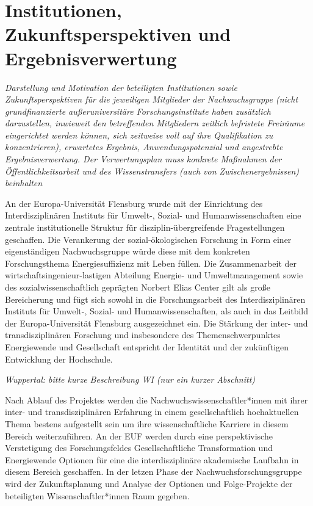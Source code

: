 \documentclass[a4paper,11pt,twoside]{scrartcl}
\begin{document}
\section{Institutionen, Zukunftsperspektiven und Ergebnisverwertung}
\textit{Darstellung und Motivation der beteiligten Institutionen sowie Zukunftsperspektiven für die jeweiligen Mitglieder der Nachwuchsgruppe (nicht grundfinanzierte außeruniversitäre Forschungsinstitute haben zusätzlich darzustellen, inwieweit den betreffenden Mitgliedern zeitlich befristete Freiräume eingerichtet werden können, sich zeitweise voll auf ihre Qualifikation zu konzentrieren), erwartetes Ergebnis, Anwendungspotenzial und angestrebte Ergebnisverwertung. Der Verwertungsplan muss konkrete Maßnahmen der Öffentlichkeitsarbeit und des Wissenstransfers (auch von Zwischenergebnissen) beinhalten}

An der Europa-Universität Flensburg wurde mit der Einrichtung des Interdisziplinären Instituts für Umwelt-, Sozial- und Humanwissenschaften eine zentrale institutionelle Struktur für disziplin-übergreifende Fragestellungen geschaffen. Die Verankerung der sozial-ökologischen Forschung in Form einer eigenständigen Nachwuchsgruppe würde diese mit dem konkreten Forschungsthema Energiesuffizienz mit Leben füllen. Die Zusammenarbeit der wirtschaftsingenieur-lastigen Abteilung Energie- und Umweltmanagement sowie des sozialwissenschaftlich geprägten Norbert Elias Center gilt als große Bereicherung und fügt sich sowohl in die Forschungsarbeit des Interdisziplinären Instituts für Umwelt-, Sozial- und Humanwissenschaften, als auch in das Leitbild der Europa-Universität Flensburg ausgezeichnet ein. Die Stärkung der inter- und transdisziplinären Forschung und insbesondere des Themenschwerpunktes Energiewende und Gesellschaft entspricht der Identität und der zukünftigen Entwicklung der Hochschule.

\textit{Wuppertal: bitte kurze Beschreibung WI (nur ein kurzer Abschnitt)}

Nach Ablauf des Projektes werden die Nachwuchswissenschaftler*innen mit ihrer inter- und transdisziplinären Erfahrung in einem gesellschaftlich hochaktuellen Thema bestens aufgestellt sein um ihre wissenschaftliche Karriere in diesem Bereich weiterzuführen. An der EUF werden durch eine perspektivische Verstetigung des Forschungsfeldes Gesellschaftliche Transformation und Energiewende Optionen für eine die interdisziplinäre akademische Laufbahn in diesem Bereich geschaffen. In der letzen Phase der Nachwuchsforschungsgruppe wird der Zukunftsplanung und Analyse der Optionen und Folge-Projekte der beteiligten Wissenschaftler*innen Raum gegeben. 
\end{document}
